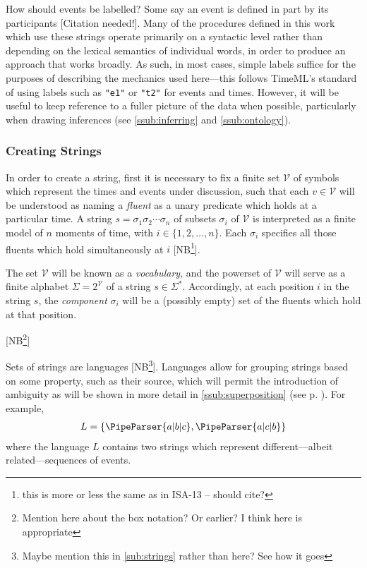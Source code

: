 \documentclass[a4paper,12pt,leqno]{article}
\newcommand{\vph}[1]{\vphantom{#1}}
\newcommand{\ebox}[1]{\fbox{$\vph{'(),}#1$}}
\newcommand{\EventString}[1]{
	\renewcommand*{\do}[1]{\ebox{##1}}%
	\PipeParser{#1}
}
\newcommand{\citeneeded}[1][]{{\color{red}[Citation needed!#1]}}
\newcommand{\selfnote}[1]{{\color{red}[NB\footnote{{\color{red}#1}}]}}
\newcommand{\nb}{\selfnote}
\begin{document}
How should events be labelled? Some say an event is defined in part by its participants \citeneeded{}. Many of the procedures defined in this work which use these strings operate primarily on a syntactic level rather than depending on the lexical semantics of individual words, in order to produce an approach that works broadly. As such, in most cases, simple labels suffice for the purposes of describing the mechanics used here---this follows TimeML's standard of using labels such as \texttt{"e1"} or \texttt{"t2"} for events and times. However, it will be useful to keep reference to a fuller picture of the data when possible, particularly when drawing inferences (see \cref{ssub:inferring} and \cref{ssub:ontology}).

\subsubsection{Creating Strings}\label{ssub:creating}
In order to create a string, first it is necessary to fix a finite set $\mathcal{V}$ of symbols which represent the times and events under discussion, such that each $v \in \mathcal{V}$ will be understood as naming a \textit{fluent} as a unary predicate which holds at a particular time. A string $s = \sigma_1\sigma_2\cdots\sigma_n$ of subsets $\sigma_i$ of $\mathcal{V}$ is interpreted as a finite model of $n$ moments of time, with $i \in \{1, 2, \ldots, n\}$. Each $\sigma_i$ specifies all those fluents which hold simultaneously at $i$ \nb{this is more or less the same as in ISA-13 -- should cite?}.

The set $\mathcal{V}$ will be known as a \textit{vocabulary}, and the powerset of $\mathcal{V}$ will serve as a finite alphabet $\Sigma = 2^{\mathcal{V}}$ of a string $s \in \Sigma^*$. Accordingly, at each position $i$ in the string $s$, the \textit{component} $\sigma_i$ will be a (possibly empty) set of the fluents which hold at that position.

\nb{Mention here about the box notation? Or earlier? I think here is appropriate}

Sets of strings are languages \selfnote{Maybe mention this in \cref{sub:strings} rather than here? See how it goes}. Languages allow for grouping strings based on some property, such as their source, which will permit the introduction of ambiguity as will be shown in more detail in \cref{ssub:superposition} (see p. \pageref{ex:lang-superposition}). For example,
\begin{align}
	L = \{\EventString{a|b|c}, \EventString{a|c|b}\}
\end{align}
where the language $L$ contains two strings which represent different---albeit related---sequences of events.
\end{document}
